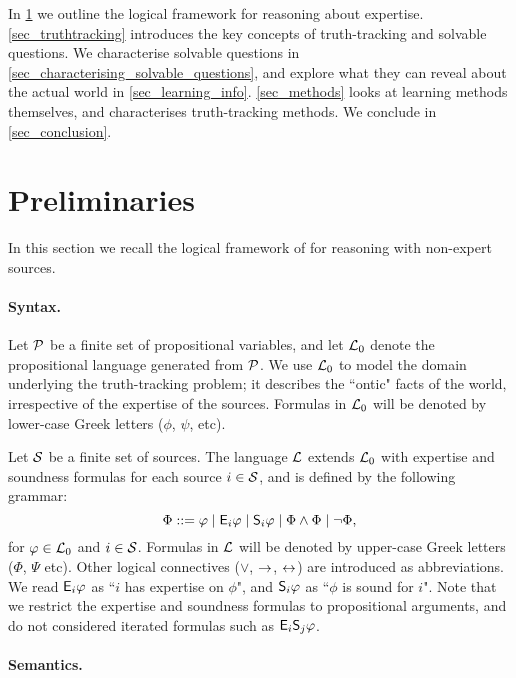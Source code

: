 In \cref{sec_preliminaries} we outline the logical framework for reasoning
about expertise. \cref{sec_truthtracking} introduces the key concepts of
truth-tracking and solvable questions. We characterise solvable questions in
\cref{sec_characterising_solvable_questions}, and explore what they can reveal
about the actual world in \cref{sec_learning_info}. \cref{sec_methods} looks at
learning methods themselves, and characterises truth-tracking methods. We
conclude in \cref{sec_conclusion}.

\section{Preliminaries}
\label{sec_preliminaries}

In this section we recall the logical framework of
\textcite{singleton_booth_22_preprint} for reasoning with non-expert sources.

\paragraph{Syntax.}

Let $\propvars$ be a finite set of propositional variables, and let $\Lprop$
denote the propositional language generated from $\propvars$. We use $\Lprop$
to model the domain underlying the truth-tracking problem; it describes the
``ontic" facts of the world, irrespective of the expertise of the sources.
Formulas in $\Lprop$ will be denoted by lower-case Greek letters ($\phi$,
$\psi$, etc).

Let $\srcs$ be a finite set of sources. The language $\L$ extends $\Lprop$ with
expertise and soundness formulas for each source $i \in \srcs$, and is defined
by the following grammar:
\[
    \Phi
    ::=  \phi
    \mid \E_i\phi
    \mid \S_i\phi
    \mid \Phi \land \Phi
    \mid \neg\Phi,
\]
for $\phi \in \Lprop$ and $i \in \srcs$. Formulas in $\L$ will be denoted by
upper-case Greek letters ($\Phi$, $\Psi$ etc). Other logical connectives
($\lor$, $\limplies$, $\liff$) are introduced as abbreviations. We read
$\E_i\phi$ as ``$i$ has expertise on $\phi$", and $\S_i\phi$ as ``$\phi$ is
sound for $i$". Note that we restrict the expertise and soundness formulas to
propositional arguments, and do not considered iterated formulas such as
$\E_i\S_j\phi$.

\paragraph{Semantics.}

